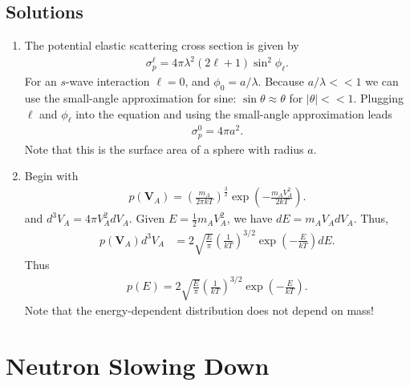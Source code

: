 \documentclass[11pt]{article}
\renewcommand\vec{\mathbf}
\begin{document}
\subsection{Solutions}
\label{sec:orgheadline26}
\begin{enumerate}
\item The potential elastic scattering cross section is given by
\begin{align}
  \sigma_p^\ell = 4\pi \lambda^2 \left(2 \ell + 1 \right) \sin^2\phi_\ell.
\end{align}
For an \(s\)-wave interaction \(\ell = 0\), and \(\phi_0 = a/\lambda\).  Because \(a/\lambda << 1\) we can use the small-angle approximation for sine: \(\sin\theta \approx \theta\) for \(|\theta| << 1\).  Plugging \(\ell\) and \(\phi_\ell\) into the equation and using the small-angle approximation leads
\begin{align}
  \sigma_p^0 = 4\pi a^2.
\end{align}
Note that this is the surface area of a sphere with radius \(a\).
\item Begin with 
\begin{align}
  p(\vec{V}_A) = \left( \frac{m_A}{2\pi k T} \right)^\frac{3}{2} \exp\left(-\frac{m_A V_A^2}{2kT}\right) .
\end{align}
and \(d^3 V_A = 4\pi V_A^2 dV_A\).  Given \(E = \frac{1}{2}m_A V_A^2\), we have \(dE = m_A V_A dV_A\).  Thus,
\begin{align}
  p(\vec{V}_A) d^3 V_A &= 2 \sqrt{\frac{E}{\pi}} \left( \frac{1}{kT} \right)^{3/2} \exp\left( - \frac{E}{kT} \right) dE.
\end{align}
Thus
\begin{align}
  p(E) = 2 \sqrt{\frac{E}{\pi}} \left( \frac{1}{kT} \right)^{3/2} \exp\left( - \frac{E}{kT} \right).
\end{align}
Note that the energy-dependent distribution does not depend on mass!
\end{enumerate}
\section{Neutron Slowing Down}
\label{sec:orgheadline43}
\end{document}
